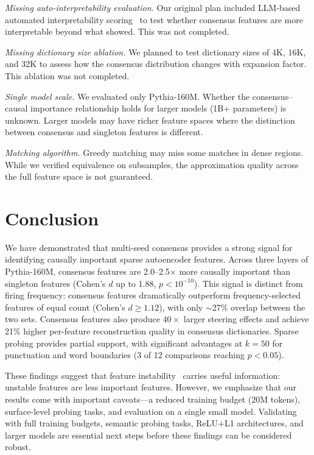 \documentclass{article}
\begin{document}
\emph{Missing auto-interpretability evaluation.} Our original plan included LLM-based automated interpretability scoring~\citep{bills2023language} to test whether consensus features are more interpretable beyond what \citet{paulo2025sparse} showed. This was not completed.

\emph{Missing dictionary size ablation.} We planned to test dictionary sizes of 4K, 16K, and 32K to assess how the consensus distribution changes with expansion factor. This ablation was not completed.

\emph{Single model scale.} We evaluated only Pythia-160M. Whether the consensus--causal importance relationship holds for larger models (1B+ parameters) is unknown. Larger models may have richer feature spaces where the distinction between consensus and singleton features is different.

\emph{Matching algorithm.} Greedy matching may miss some matches in dense regions. While we verified equivalence on subsamples, the approximation quality across the full feature space is not guaranteed.

\section{Conclusion}
\label{sec:conclusion}

We have demonstrated that multi-seed consensus provides a strong signal for identifying causally important sparse autoencoder features. Across three layers of Pythia-160M, consensus features are 2.0--2.5$\times$ more causally important than singleton features (Cohen's $d$ up to 1.88, $p < 10^{-10}$). This signal is distinct from firing frequency: consensus features dramatically outperform frequency-selected features of equal count (Cohen's $d \geq 1.12$), with only $\sim$27\% overlap between the two sets. Consensus features also produce $40\times$ larger steering effects and achieve 21\% higher per-feature reconstruction quality in consensus dictionaries. Sparse probing provides partial support, with significant advantages at $k{=}50$ for punctuation and word boundaries (3 of 12 comparisons reaching $p < 0.05$).

These findings suggest that feature instability~\citep{paulo2025sparse} carries useful information: unstable features are less important features. However, we emphasize that our results come with important caveats---a reduced training budget (20M tokens), surface-level probing tasks, and evaluation on a single small model. Validating with full training budgets, semantic probing tasks, ReLU+L1 architectures, and larger models are essential next steps before these findings can be considered robust.
\end{document}
